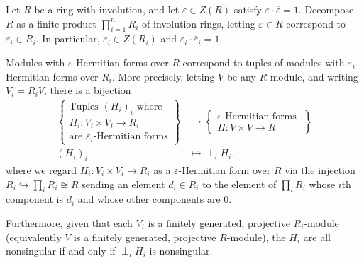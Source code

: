 \begin{lemma} \label{lemma:hermitian_modules_over_product_of_involution_rings_split_along_involution_ring_factors}
    Let $R$ be a ring with involution, and let $\varepsilon \in Z(R)$ satisfy $\varepsilon \cdot \overline{\varepsilon} = 1$. Decompose $R$ as a finite product $\prod_{i=1}^n R_i$ of involution rings, letting $\varepsilon \in R$ correspond to $\varepsilon_i \in R_i$. In particular, $\varepsilon_i \in Z(R_i)$ and $\varepsilon_i \cdot \overline{\varepsilon}_i = 1$. 
    
    Modules with $\varepsilon$-Hermitian forms over $R$ correspond to tuples of modules with $\varepsilon_i$-Hermitian forms over $R_i$. More precisely, letting $V$ be any $R$-module, and writing $V_i = R_i V$, there is a bijection
        \begin{align*}
        \left\{ \begin{array}{l} \text{Tuples } (H_i)_i \text{ where } \\ H_i: V_i \times V_i \to R_i \\ \text{are } \varepsilon_i\text{-Hermitian forms} \end{array} \right\} &\to \left\{ \begin{array}{l} \varepsilon\text{-Hermitian forms } \\ H: V \times V \to R \end{array}\right\}  \\
        (H_i)_i &\mapsto \perp_i H_i,
        \end{align*}
    where we regard $H_i: V_i \times V_i \to R_i$ as a $\varepsilon$-Hermitian form over $R$ via the injection $R_i \hookrightarrow \prod_i R_i \cong R$ sending an element $d_i \in R_i$ to the element of $\prod_i R_i$ whose $i$th component is $d_i$ and whose other components are $0$. 
    
    Furthermore, given that each $V_i$ is a finitely generated, projective $R_i$-module (equivalently $V$ is a finitely generated, projective $R$-module), the $H_i$ are all nonsingular if and only if $\perp_i H_i$ is nonsingular.
\end{lemma}